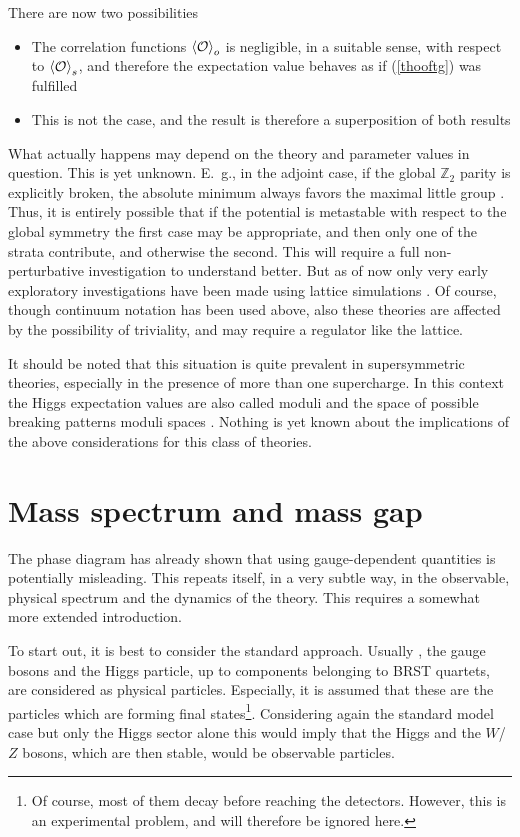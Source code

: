 \documentclass[final,12pt,3p,longtitle]{elsarticle}
\newcommand*{\pref}[1]{(\ref{#1})}
\newcommand*{\1}{1\!\!\!\bot}
\newcommand*{\la}{\left\langle}
\newcommand*{\ra}{\right\rangle}
\newcommand*{\op}{{\cal O}}
\begin{document}
There are now two possibilities
\begin{itemize}
 \item The correlation functions $\la\op\ra_o$ is negligible, in a suitable sense, with respect to $\la\op\ra_s$, and therefore the expectation value behaves as if \pref{thooftg} was fulfilled
 \item This is not the case, and the result is therefore a superposition of both results
\end{itemize}
What actually happens may depend on the theory and parameter values in question. This is yet unknown. E.\ g., in the adjoint case, if the global $\mathbb{Z}_2$ parity is explicitly broken, the absolute minimum always favors the maximal little group \cite{O'Raifeartaigh:1986vq}. Thus, it is entirely possible that if the potential is metastable with respect to the global symmetry the first case may be appropriate, and then only one of the strata contribute, and otherwise the second. This will require a full non-perturbative investigation to understand better. But as of now only very early exploratory investigations have been made using lattice simulations \cite{Gupta:1983zv,Lee:1985yi,Olynyk:1985tr,Kikugawa:1985ex,Azcoiti:1987ua}. Of course, though continuum notation has been used above, also these theories are affected by the possibility of triviality, and may require a regulator like the lattice.

It should be noted that this situation is quite prevalent in supersymmetric theories, especially in the presence of more than one supercharge. In this context the Higgs expectation values are also called moduli and the space of possible breaking patterns moduli spaces \cite{Weinberg:2000cr}. Nothing is yet known about the implications of the above considerations for this class of theories.

\section{Mass spectrum and mass gap}\label{s:spectrum}

The phase diagram has already shown that using gauge-dependent quantities is potentially misleading. This repeats itself, in a very subtle way, in the observable, physical spectrum and the dynamics of the theory. This requires a somewhat more extended introduction.

To start out, it is best to consider the standard approach. Usually \cite{Bohm:2001yx}, the gauge bosons and the Higgs particle, up to components belonging to BRST quartets, are considered as physical particles. Especially, it is assumed that these are the particles which are forming final states\footnote{Of course, most of them decay before reaching the detectors. However, this is an experimental problem, and will therefore be ignored here.}. Considering again the standard model case but only the Higgs sector alone this would imply that the Higgs and the $W$/$Z$ bosons, which are then stable, would be observable particles.
\end{document}
